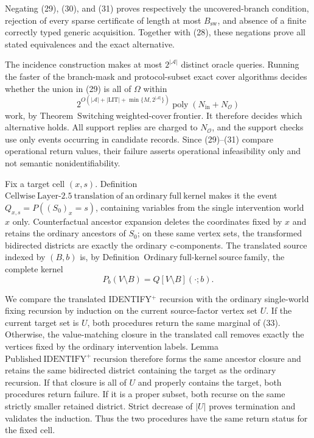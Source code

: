 Negating (29), (30), and (31) proves respectively the uncovered-branch condition, rejection of every sparse certificate of length at most \(B_{\mathrm{sw}}\), and absence of a finite correctly typed generic acquisition.  Together with (28), these negations prove all stated equivalences and the exact alternative.

The incidence construction makes at most \(2^{|\mathcal A|}\) distinct oracle queries.  Running the faster of the branch-mask and protocol-subset exact cover algorithms decides whether the union in (29) is all of \(\Omega\) within
\[
 2^{O(|\mathcal A|+|\mathrm{LIT}|+\min\{M,2^{|\mathcal A|}\})}
 \operatorname{poly}(N_{\mathrm{in}}+N_{\mathcal O})
 \tag{32}
\]
work, by Theorem~\(\mathrm{Switching\ weighted\mbox{-}cover\ frontier}\).  It therefore decides which alternative holds.  All support replies are charged to \(N_{\mathcal O}\), and the support checks use only events occurring in candidate records.  Since (29)--(31) compare operational return values, their failure asserts operational infeasibility only and not semantic nonidentifiability.

Fix a target cell \((x,s)\).  Definition~\(\mathrm{Cellwise\ Layer\mbox{-}2.5\ translation\ of\ an\ ordinary\ full\ kernel}\) makes it the event
\(Q_{x,s}=P((S_0)_x=s)\), containing variables from the single intervention world \(x\) only.  Counterfactual ancestor expansion deletes the coordinates fixed by \(x\) and retains the ordinary ancestors of \(S_0\); on these same vertex sets, the transformed bidirected districts are exactly the ordinary c-components.  The translated source indexed by \((B,b)\) is, by Definition~\(\mathrm{Ordinary\ full\mbox{-}kernel\ source\ family}\), the complete kernel
\[
 P_b(V\setminus B)=Q[V\setminus B](\cdot;b).
 \tag{33}
\]

We compare the translated IDENTIFY\({}^{+}\) recursion with the ordinary single-world fixing recursion by induction on the current source-factor vertex set \(U\).  If the current target set is \(U\), both procedures return the same marginal of (33).  Otherwise, the value-matching closure in the translated call removes exactly the vertices fixed by the ordinary intervention labels.  Lemma~\(\mathrm{Published\ IDENTIFY}^{+}\mathrm{\ recursion}\) therefore forms the same ancestor closure and retains the same bidirected district containing the target as the ordinary recursion.  If that closure is all of \(U\) and properly contains the target, both procedures return failure.  If it is a proper subset, both recurse on the same strictly smaller retained district.  Strict decrease of \(|U|\) proves termination and validates the induction.  Thus the two procedures have the same return status for the fixed cell.

